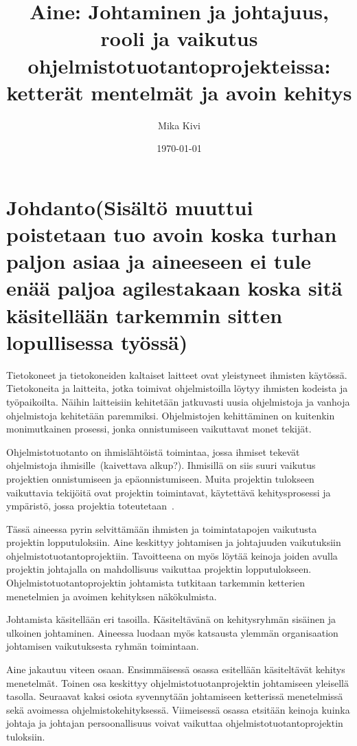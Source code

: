 \documentclass[finnish]{tktltiki2}
\title{Aine: Johtaminen ja johtajuus, rooli ja vaikutus ohjelmistotuotantoprojekteissa: ketterät mentelmät ja avoin kehitys}
\author{Mika Kivi}
\date{\today}
\theoremstyle{definition}
\theoremstyle{remark}
\begin{document}

\maketitle        %
\makeabstract     %

\tableofcontents  %
\newpage          %



\section{Johdanto(Sisältö muuttui poistetaan tuo avoin koska turhan paljon asiaa ja aineeseen ei tule enää paljoa agilestakaan koska sitä käsitellään tarkemmin sitten lopullisessa työssä)}

Tietokoneet ja tietokoneiden kaltaiset laitteet ovat yleistyneet ihmisten käytössä. Tietokoneita ja laitteita, jotka toimivat ohjelmistoilla löytyy ihmisten kodeista ja työpaikoilta. Näihin laitteisiin kehitetään jatkuvasti uusia ohjelmistoja ja vanhoja ohjelmistoja kehitetään paremmiksi. Ohjelmistojen kehittäminen on kuitenkin monimutkainen prosessi, jonka onnistumiseen vaikuttavat monet tekijät.

Ohjelmistotuotanto on ihmislähtöistä toimintaa, jossa ihmiset tekevät ohjelmistoja ihmisille~\cite{Wang:2010:PPP:1810295.1810302}(kaivettava alkup?). Ihmisillä on siis suuri vaikutus projektien onnistumiseen ja epäonnistumiseen. Muita projektin tulokseen vaikuttavia tekijöitä ovat projektin toimintavat, käytettävä kehitysprosessi ja ympäristö, jossa projektia toteutetaan~\cite{McLeod:2011:FAS:1978802.1978803}. 


Tässä aineessa pyrin selvittämään ihmisten ja toimintatapojen vaikutusta projektin lopputuloksiin. Aine keskittyy johtamisen ja johtajuuden vaikutuksiin ohjelmistotuotantoprojektiin. Tavoitteena on myös löytää keinoja joiden avulla projektin johtajalla on mahdollisuus vaikuttaa projektin lopputulokseen. Ohjelmistotuotantoprojektin johtamista tutkitaan tarkemmin ketterien menetelmien ja avoimen kehityksen näkökulmista.

Johtamista käsitellään eri tasoilla. Käsiteltävänä on kehitysryhmän sisäinen ja ulkoinen johtaminen. Aineessa luodaan myös katsausta ylemmän organisaation johtamisen vaikutuksesta ryhmän toimintaan. 

Aine jakautuu viteen osaan. Ensimmäisessä osassa esitellään käsiteltävät kehitys menetelmät. Toinen osa keskittyy ohjelmistotuotanprojektin johtamiseen yleisellä tasolla. Seuraavat kaksi osiota syvennytään johtamiseen ketterissä menetelmissä sekä avoimessa ohjelmistokehityksessä. Viimeisessä osassa etsitään keinoja kuinka johtaja ja johtajan persoonallisuus voivat vaikuttaa ohjelmistotuotantoprojektin tuloksiin.
  
\end{document}
